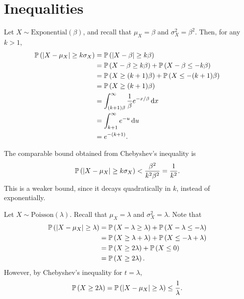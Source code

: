 \chapter{Inequalities}

\begin{ex}
  Let $X\sim\text{Exponential}(\beta)$, and recall that $\mu_X=\beta$ and
  $\sigma^2_X=\beta^2$. Then, for any $k>1$,
  \begin{align*}
    \P{|X-\mu_X|\geq k\sigma_X}
     & =\P{|X-\beta|\geq k\beta}                                    \\
     & =\P{X-\beta\geq k\beta}+\P{X-\beta\leq -k\beta}              \\
     & =\P{X\geq (k+1)\beta}+\P{X\leq -(k+1)\beta}                  \\
     & =\P{X\geq (k+1)\beta}                                        \\
     & =\int_{(k+1)\beta}^\infty \frac{1}{\beta}e^{-x/\beta}\,\d{x} \\
     & =\int_{k+1}^\infty e^{-u}\,\d{u}                             \\
     & =e^{-(k+1)}.
  \end{align*}

  The comparable bound obtained from Chebyshev's inequality is
  \begin{align*}
    \P{|X-\mu_X|\geq k\sigma_X}<\frac{\beta^2}{k^2\beta^2}=\frac{1}{k^2}.
  \end{align*}
  This is a weaker bound, since it decays quadratically in $k$, instead of
  exponentially.
\end{ex}

\begin{ex}
  Let $X\sim\text{Poisson}(\lambda)$. Recall that $\mu_X=\lambda$ and
  $\sigma_X^2=\lambda$. Note that
  \begin{align*}
    \P{|X-\mu_X|\geq \lambda}
     & =\P{X-\lambda\geq \lambda}+\P{X-\lambda\leq -\lambda}     \\
     & =\P{X\geq \lambda + \lambda}+\P{X\leq -\lambda + \lambda} \\
     & =\P{X\geq 2\lambda}+\P{X\leq 0}                           \\
     & =\P{X\geq 2\lambda}.
  \end{align*}
  However, by Chebyshev's inequality for $t=\lambda$,
  \[
    \P{X\geq 2\lambda}
    =\P{|X-\mu_X|\geq \lambda}
    \leq \frac{1}{\lambda}.
  \]
\end{ex}

